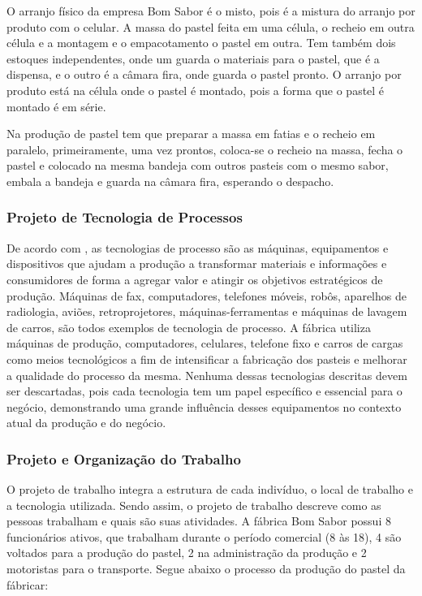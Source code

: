 O arranjo físico da empresa Bom Sabor é o misto, pois é a mistura do arranjo por produto com o celular. A massa do pastel feita em uma célula, o recheio em outra célula e a montagem e o empacotamento o pastel em outra. Tem também dois estoques independentes, onde um guarda o materiais para o pastel, que é a dispensa, e o outro é a câmara fira, onde guarda o pastel pronto. O arranjo por produto está na célula onde o pastel é montado, pois a forma que o pastel é montado é em série.

Na produção de pastel tem que preparar a massa em fatias e o recheio em paralelo, primeiramente, uma vez prontos, coloca-se o recheio na massa, fecha o pastel e colocado na mesma bandeja com outros pasteis com o mesmo sabor, embala a bandeja e guarda na câmara fira, esperando o despacho.

\subsubsection{Projeto de Tecnologia de Processos}

De acordo com \cite{INTRANET}, as tecnologias de processo são as máquinas, equipamentos e dispositivos que ajudam a produção a transformar materiais e informações e consumidores de forma a agregar valor e atingir os objetivos estratégicos de produção. Máquinas de fax, computadores, telefones móveis, robôs, aparelhos de radiologia, aviões, retroprojetores, máquinas-ferramentas e máquinas de lavagem de carros, são todos exemplos de tecnologia de processo. 
A fábrica utiliza máquinas de produção, computadores, celulares, telefone fixo e carros de cargas como meios tecnológicos a fim de intensificar a fabricação dos pasteis e melhorar a qualidade do processo da mesma.
Nenhuma dessas tecnologias descritas devem ser descartadas, pois cada tecnologia tem um papel específico e essencial para o negócio, demonstrando uma grande influência desses equipamentos no contexto atual da produção e do negócio.

\subsubsection{Projeto e Organização do Trabalho}

O projeto de trabalho integra a estrutura de cada indivíduo, o local de trabalho e a tecnologia utilizada. Sendo assim, o projeto de trabalho descreve como as pessoas trabalham e quais são suas atividades. A fábrica Bom Sabor possui 8 funcionários ativos, que trabalham durante o período comercial (8 às 18), 4 são voltados para a produção do pastel, 2 na administração da produção e 2 motoristas para o transporte. Segue abaixo o processo da produção do pastel da fábricar:

